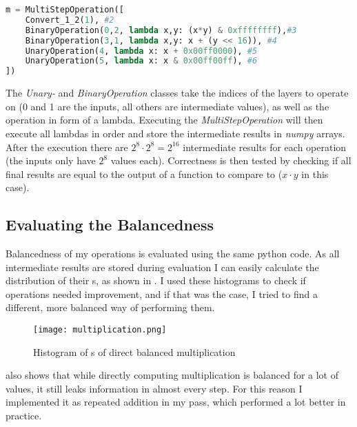 \begin{lstlisting}[language=python, caption=Step-by-step execution of balanced multiplication, label=lst:multiop]
m = MultiStepOperation([
    Convert_1_2(1), #2
    BinaryOperation(0,2, lambda x,y: (x*y) & 0xffffffff),#3
    BinaryOperation(3,1, lambda x,y: x + (y << 16)), #4
    UnaryOperation(4, lambda x: x + 0x00ff0000), #5
    UnaryOperation(5, lambda x: x & 0x00ff00ff), #6
])
\end{lstlisting}

The \emph{Unary-} and \emph{BinaryOperation} classes take the indices of the layers to operate on (0 and 1 are the inputs, all others are intermediate values), as well as the operation in form of a lambda.
Executing the \emph{MultiStepOperation} will then execute all lambdas in order and store the intermediate results in \emph{numpy} arrays.
After the execution there are $2^8 \cdot 2^8 = 2^{16}$ intermediate results for each operation (the inputs only have $2^8$ values each).
Correctness is then tested by checking if all final results are equal to the output of a function to compare to ($x \cdot y$ in this case).

\subsection{Evaluating the Balancedness}
\label{balance-eval}
Balancedness of my operations is evaluated using the same python code.
As all intermediate results are stored during evaluation I can easily calculate the distribution of their \hammingw s, as shown in .
I used these histograms to check if operations needed improvement, and if that was the case, I tried to find a different, more balanced way of performing them.

\begin{figure}[h]
  \centering
  \texttt{[image: multiplication.png]}
  \caption{Histogram of \hammingw s of direct balanced multiplication}
  \label{fig:mult}
\end{figure}

 also shows that while directly computing multiplication is balanced for a lot of values, it still leaks information in almost every step.
For this reason I implemented it as repeated addition in my pass, which performed a lot better in practice.
